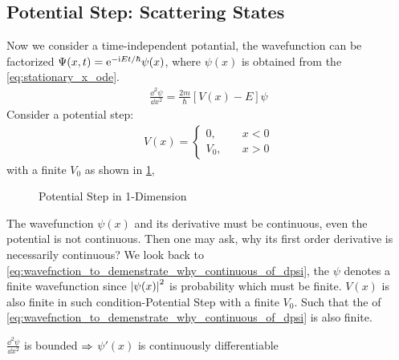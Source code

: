 \subsection{{Potential Step: Scattering States}} \label{subsec:scattering_state}
Now we consider a time-independent potantial, the wavefunction can be factorized $\Psi(x,t) = \mathrm{e}^{-\mathrm{i} Et/\hbar} \psi(x)$, where $\psi(x)$ is obtained from the \cref{eq:stationary_x_ode}. 
\begin{align}
    \frac{\dd^2 \psi}{\dd x^2} = \frac{2m}{\hbar} \left[V(x) - E\right]\psi \label{eq:wavefnction_to_demenstrate_why_continuous_of_dpsi}
\end{align}
Consider a potential step:
\begin{eqnarray}
    V(x) = \begin{cases}
        0, \quad  &x < 0 \\
        V_0, \quad &x > 0
        \end{cases}
\end{eqnarray}
with a finite $V_0$ as shown in \cref{fig:potential_step},
\begin{figure}[h]
    \centering
      \caption{Potential Step in 1-Dimension}
      \label{fig:potential_step}
\end{figure}
The wavefunction $\psi(x)$ and its derivative must be continuous, even the potential is not continuous. Then one may ask, why its first order derivative is necessarily continuous? We look back to \cref{eq:wavefnction_to_demenstrate_why_continuous_of_dpsi}, the $\psi$ denotes a finite wavefunction since $\left| \psi(x) \right|^2$ is probability which must be finite. $V(x)$ is also finite in such condition-Potential Step with a finite $V_0$. Such that the \lhs of \cref{eq:wavefnction_to_demenstrate_why_continuous_of_dpsi} is also finite.
\begin{tcolorbox}
   \begin{center}
    $ \frac{\dd^2 \psi}{\dd x^2}$ is bounded $\Rightarrow$ $\psi'(x)$ is continuously differentiable 
   \end{center}
\end{tcolorbox}
